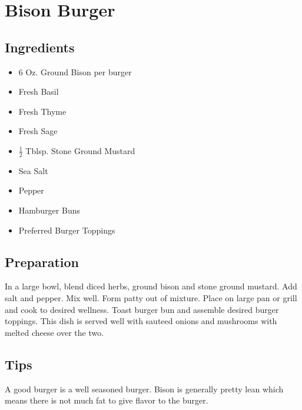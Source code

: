 \thispagestyle{fancy}
\section{Bison Burger} \label{bisonburger}
\AddToShipoutPicture*{\bisonburger}


\subsection*{Ingredients}

\begin{multicols}{3}
	\begin{itemize}
		\item 6 Oz. Ground Bison per burger
		\item Fresh Basil
		\item Fresh Thyme
		\item Fresh Sage
		\item $\frac{1}{2}$ Tblsp. Stone Ground Mustard
		\item Sea Salt
		\item Pepper
		\item Hamburger Buns
		\item Preferred Burger Toppings
	\end{itemize}
\end{multicols}

\subsection*{Preparation}

In a large bowl, blend diced herbs, ground bison and stone ground mustard. Add salt and pepper. Mix well. Form patty out of mixture. Place on large pan or grill and cook to desired wellness. Toast burger bun and assemble desired burger toppings. This dish is served well with sauteed onions and mushrooms with melted cheese over the two.

\subsection*{Tips}

A good burger is a well seasoned burger. Bison is generally pretty lean which means there is not much fat to give flavor to the burger.
